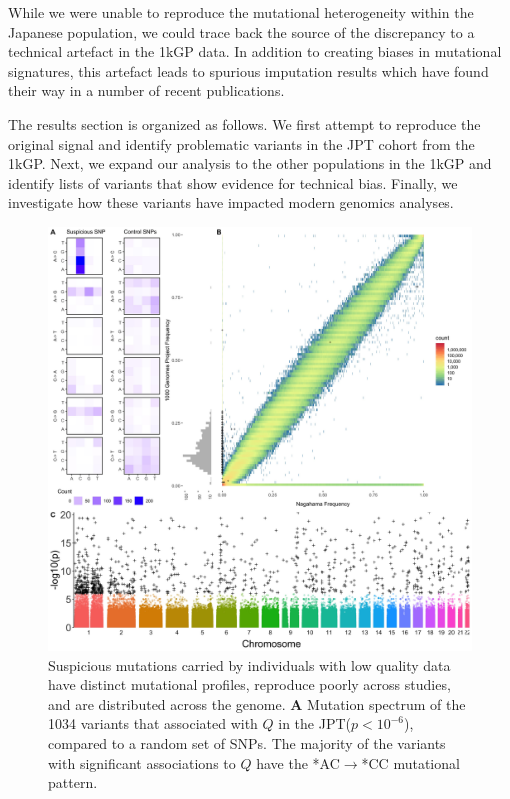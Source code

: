 \documentclass[9pt,lineno]{template}
\begin{document}
While we were unable to reproduce the mutational heterogeneity within the Japanese population, we could trace back the source of the discrepancy to a technical artefact in the 1kGP data.
In addition to creating biases in mutational signatures, this artefact leads to spurious imputation results which have found their way in a number of recent publications.


The results section is organized as follows.
We first attempt to reproduce the original signal and identify problematic variants in the JPT cohort from the 1kGP. 
Next, we expand our analysis to the other populations in the 1kGP and identify lists of variants that show evidence for technical bias.
Finally, we investigate how these variants have impacted modern genomics analyses.
  

\begin{figure}
\includegraphics[width=\hsize,keepaspectratio]{../Figures/Figure1.jpg}
\caption{
Suspicious mutations carried by individuals with low quality data have distinct mutational profiles, reproduce poorly across studies, and are distributed across the genome. \textbf{A} 
Mutation spectrum of the 1034 variants that associated with $Q$ in the JPT($p < 10^{-6}$), compared to a random set of SNPs.
The majority of the variants with significant associations to $Q$ have the *AC${\rightarrow}$*CC mutational pattern. 
}
\end{figure}
\end{document}
